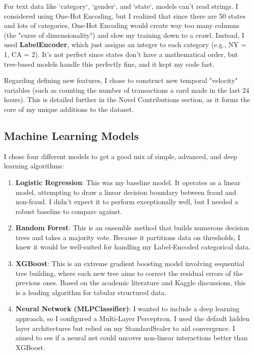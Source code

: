 \documentclass[11pt]{article}
\begin{document}
For text data like `category`, `gender`, and `state`, models can't read strings. I considered using One-Hot Encoding, but I realized that since there are 50 states and lots of categories, One-Hot Encoding would create way too many columns (the "curse of dimensionality") and slow my training down to a crawl. Instead, I used \textbf{LabelEncoder}, which just assigns an integer to each category (e.g., NY = 1, CA = 2). It's not perfect since states don't have a mathematical order, but tree-based models handle this perfectly fine, and it kept my code fast.

Regarding defining new features, I chose to construct new temporal "velocity" variables (such as counting the number of transactions a card made in the last 24 hours). This is detailed further in the Novel Contributions section, as it forms the core of my unique additions to the dataset.

\subsection{Machine Learning Models}
I chose four different models to get a good mix of simple, advanced, and deep learning algorithms:

\begin{enumerate}
    \item \textbf{Logistic Regression}: This was my baseline model. It operates as a linear model, attempting to draw a linear decision boundary between fraud and non-fraud. I didn't expect it to perform exceptionally well, but I needed a robust baseline to compare against.
    \item \textbf{Random Forest}: This is an ensemble method that builds numerous decision trees and takes a majority vote. Because it partitions data on thresholds, I knew it would be well-suited for handling my Label-Encoded categorical data.
    \item \textbf{XGBoost}: This is an extreme gradient boosting model involving sequential tree building, where each new tree aims to correct the residual errors of the previous ones. Based on the academic literature and Kaggle discussions, this is a leading algorithm for tabular structured data.
    \item \textbf{Neural Network (MLPClassifier)}: I wanted to include a deep learning approach, so I configured a Multi-Layer Perceptron. I used the default hidden layer architectures but relied on my StandardScaler to aid convergence. I aimed to see if a neural net could uncover non-linear interactions better than XGBoost.
\end{enumerate}
\end{document}
